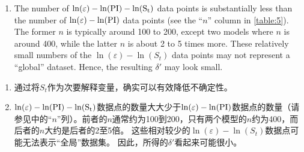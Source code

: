 \begin{paracol}{2}
\begin{enumerate}
        \item The number of $\ln(\varepsilon)-\ln(\rm{PI})-\ln(S_t)$ data points is substantially less than the number of $\ln(\varepsilon)-\ln(\rm{PI})$ data points (see the “$n$” column in \autoref{table:5}). The former $n$ is typically around 100 to 200, except two models where $n$ is around 400, while the latter $n$ is about 2 to 5 times more. These relatively small numbers of the $\ln(\varepsilon)-\ln(S_t)$ data points may not represent a “global” dataset. Hence, the resulting $\delta'$ may look small.
    \end{enumerate}

    \switchcolumn
    \begin{enumerate}
        \item 通过将$S_t$作为次要解释变量，确实可以有效降低不确定性。
        
        \item $\ln(\varepsilon)-\ln(\rm{PI})-\ln(S_t)$数据点的数量大大少于$\ln(\varepsilon)-\ln(\rm{PI})$数据点的数量（请参见中的“$n$”列）。前者的$n$通常约为100到200，只有两个模型的$n$约为400，而后者的$n$大约是后者的2至5倍。 这些相对较少的$\ln(\varepsilon)-\ln(S_t)$数据点可能无法表示“全局”数据集。 因此，所得的$\delta'$看起来可能很小。
    \end{enumerate}

\end{paracol}
